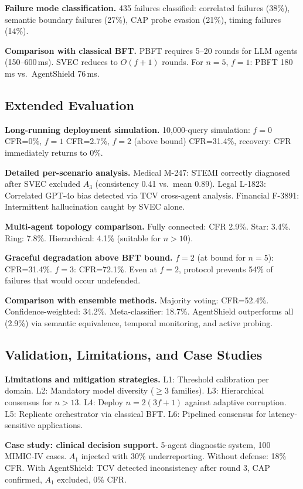 \documentclass[journal,10pt]{IEEEtran}
\begin{document}
\textbf{Failure mode classification.}
435 failures classified: correlated failures (38\%), semantic boundary failures (27\%), CAP probe evasion (21\%), timing failures (14\%).

\textbf{Comparison with classical BFT.}
PBFT requires 5--20 rounds for LLM agents (150--600\,ms). SVEC reduces to $O(f+1)$ rounds. For $n=5$, $f=1$: PBFT 180\,ms vs.\ AgentShield 76\,ms.

\subsection{Extended Evaluation}
\textbf{Long-running deployment simulation.}
10{,}000-query simulation: $f=0$ CFR=0\%, $f=1$ CFR=2.7\%, $f=2$ (above bound) CFR=31.4\%, recovery: CFR immediately returns to 0\%.

\textbf{Detailed per-scenario analysis.}
Medical M-247: STEMI correctly diagnosed after SVEC excluded $A_3$ (consistency 0.41 vs.\ mean 0.89). Legal L-1823: Correlated GPT-4o bias detected via TCV cross-agent analysis. Financial F-3891: Intermittent hallucination caught by SVEC alone.

\textbf{Multi-agent topology comparison.}
Fully connected: CFR 2.9\%. Star: 3.4\%. Ring: 7.8\%. Hierarchical: 4.1\% (suitable for $n>10$).

\textbf{Graceful degradation above BFT bound.}
$f=2$ (at bound for $n=5$): CFR=31.4\%. $f=3$: CFR=72.1\%. Even at $f=2$, protocol prevents 54\% of failures that would occur undefended.

\textbf{Comparison with ensemble methods.}
Majority voting: CFR=52.4\%. Confidence-weighted: 34.2\%. Meta-classifier: 18.7\%. AgentShield outperforms all (2.9\%) via semantic equivalence, temporal monitoring, and active probing.

\subsection{Validation, Limitations, and Case Studies}
\textbf{Limitations and mitigation strategies.}
L1: Threshold calibration per domain. L2: Mandatory model diversity ($\geq 3$ families). L3: Hierarchical consensus for $n>13$. L4: Deploy $n=2(3f+1)$ against adaptive corruption. L5: Replicate orchestrator via classical BFT. L6: Pipelined consensus for latency-sensitive applications.

\textbf{Case study: clinical decision support.}
5-agent diagnostic system, 100 MIMIC-IV cases. $A_1$ injected with 30\% underreporting. Without defense: 18\% CFR. With AgentShield: TCV detected inconsistency after round 3, CAP confirmed, $A_1$ excluded, 0\% CFR.
\end{document}
